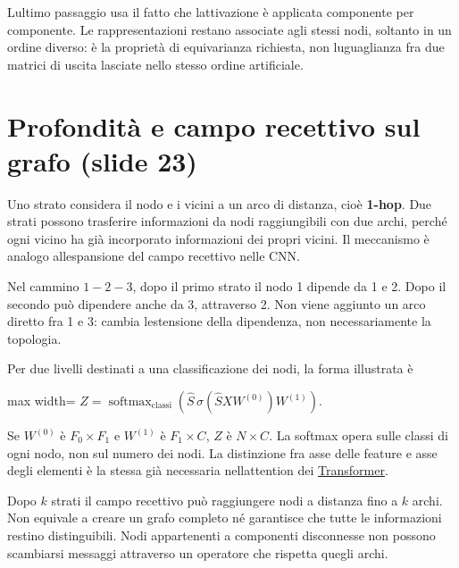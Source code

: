 \documentclass[11pt,a4paper,oneside,openany]{book}
\begin{document}
L\textquotesingle ultimo passaggio usa il fatto che l\textquotesingle attivazione è applicata componente per componente. Le rappresentazioni restano associate agli stessi nodi, soltanto in un ordine diverso: è la proprietà di equivarianza richiesta, non l\textquotesingle uguaglianza fra due matrici di uscita lasciate nello stesso ordine artificiale.

\section{Profondità e campo recettivo sul grafo (slide 23)}\label{f05-r282}

Uno strato considera il nodo e i vicini a un arco di distanza, cioè \textbf{1-hop}. Due strati possono trasferire informazioni da nodi raggiungibili con due archi, perché ogni vicino ha già incorporato informazioni dei propri vicini. Il meccanismo è analogo all\textquotesingle espansione del campo recettivo nelle CNN.

Nel cammino \(1-2-3\), dopo il primo strato il nodo 1 dipende da 1 e 2. Dopo il secondo può dipendere anche da 3, attraverso 2. Non viene aggiunto un arco diretto fra 1 e 3: cambia l\textquotesingle estensione della dipendenza, non necessariamente la topologia.

Per due livelli destinati a una classificazione dei nodi, la forma illustrata è

\begin{center}
\begin{adjustbox}{max width=\linewidth}
$\displaystyle Z=\operatorname{softmax}_{\mathrm{classi}}\left(\widehat S\,\sigma(\widehat SXW^{(0)})W^{(1)}\right).$
\end{adjustbox}
\end{center}

Se \(W^{(0)}\) è \(F_0\times F_1\) e \(W^{(1)}\) è \(F_1\times C\), \(Z\) è \(N\times C\). La softmax opera sulle classi di ogni nodo, non sul numero dei nodi. La distinzione fra asse delle feature e asse degli elementi è la stessa già necessaria nell\textquotesingle attention dei \hyperref[fonte04]{Transformer}.

Dopo \(k\) strati il campo recettivo può raggiungere nodi a distanza fino a \(k\) archi. Non equivale a creare un grafo completo né garantisce che tutte le informazioni restino distinguibili. Nodi appartenenti a componenti disconnesse non possono scambiarsi messaggi attraverso un operatore che rispetta quegli archi.
\end{document}
